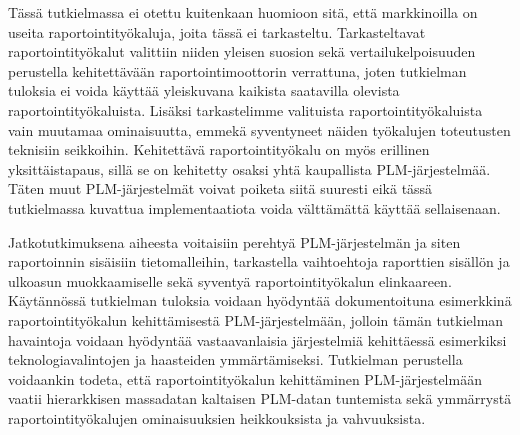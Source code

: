 Tässä tutkielmassa ei otettu kuitenkaan huomioon sitä, että markkinoilla on useita raportointityökaluja, joita tässä ei tarkasteltu. Tarkasteltavat raportointityökalut valittiin niiden yleisen suosion sekä vertailukelpoisuuden perustella kehitettävään raportointimoottorin verrattuna, joten tutkielman tuloksia ei voida käyttää yleiskuvana kaikista saatavilla olevista raportointityökaluista. Lisäksi tarkastelimme valituista raportointityökaluista vain muutamaa ominaisuutta, emmekä syventyneet näiden työkalujen toteutusten teknisiin seikkoihin. Kehitettävä raportointityökalu on myös erillinen yksittäistapaus, sillä se on kehitetty osaksi yhtä kaupallista PLM-järjestelmää. Täten muut PLM-järjestelmät voivat poiketa siitä suuresti eikä tässä tutkielmassa kuvattua implementaatiota voida välttämättä käyttää sellaisenaan.

Jatkotutkimuksena aiheesta voitaisiin perehtyä PLM-järjestelmän ja siten raportoinnin sisäisiin tietomalleihin, tarkastella vaihtoehtoja raporttien sisällön ja ulkoasun muokkaamiselle sekä syventyä raportointityökalun elinkaareen. Käytännössä tutkielman tuloksia voidaan hyödyntää dokumentoituna esimerkkinä raportointityökalun kehittämisestä PLM-järjestelmään, jolloin tämän tutkielman havaintoja voidaan hyödyntää vastaavanlaisia järjestelmiä kehittäessä esimerkiksi teknologiavalintojen ja haasteiden ymmärtämiseksi. Tutkielman perustella voidaankin todeta, että raportointityökalun kehittäminen PLM-järjestelmään vaatii hierarkkisen massadatan kaltaisen PLM-datan tuntemista sekä ymmärrystä raportointityökalujen ominaisuuksien heikkouksista ja vahvuuksista.

